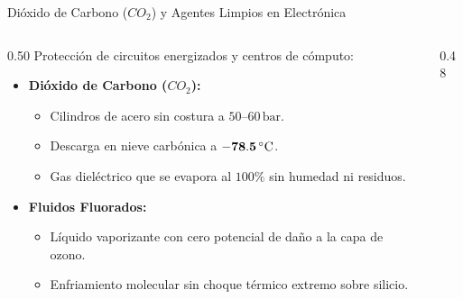 \begin{frame}{Dióxido de Carbono ($CO_2$) y Agentes Limpios en Electrónica}
  \begin{columns}[c]
    \begin{column}{0.50\textwidth}
      Protección de circuitos energizados y centros de cómputo:
      \begin{itemize}
        \small
        \item \textbf{Dióxido de Carbono ($CO_2$):}
        \begin{itemize}
          \scriptsize
          \item Cilindros de acero sin costura a $50\text{--}60\,\mathrm{bar}$.
          \item Descarga en nieve carbónica a $\mathbf{-78.5\,^\circ\mathrm{C}}$.
          \item Gas dieléctrico que se evapora al $100\%$ sin humedad ni residuos.
        \end{itemize}
        \item \textbf{Fluidos Fluorados:}
        \begin{itemize}
          \scriptsize
          \item Líquido vaporizante con cero potencial de daño a la capa de ozono.
          \item Enfriamiento molecular sin choque térmico extremo sobre silicio.
        \end{itemize}
      \end{itemize}
    \end{column}

    \begin{column}{0.48\textwidth}
      \centering
\end{column}
\end{columns}
\end{frame}
